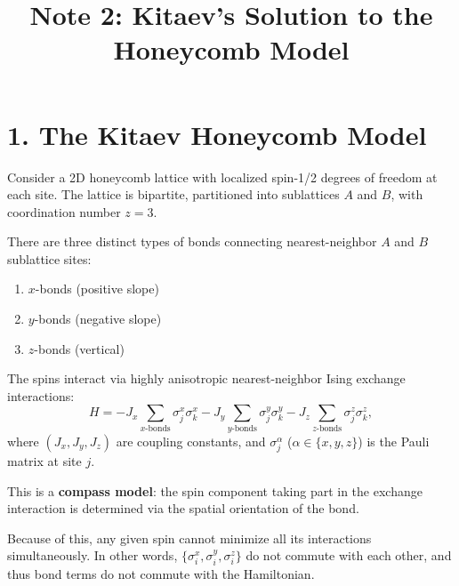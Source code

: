\documentclass[11pt,a4paper]{article}
\title{\textbf{Note 2: Kitaev's Solution to the Honeycomb Model}}
\date{}
\begin{document}
\maketitle

\section*{1. The Kitaev Honeycomb Model}

Consider a 2D honeycomb lattice with localized spin-1/2 degrees of freedom at each site. The lattice is bipartite, partitioned into sublattices $A$ and $B$, with coordination number $z = 3$.

There are three distinct types of bonds connecting nearest-neighbor $A$ and $B$ sublattice sites:
\begin{enumerate}
    \item $x$-bonds (positive slope)
    \item $y$-bonds (negative slope)
    \item $z$-bonds (vertical)
\end{enumerate}

The spins interact via highly anisotropic nearest-neighbor Ising exchange interactions:
\begin{equation}
    H = -J_x \sum_{x\text{-bonds}} \sigma_j^x \sigma_k^x - J_y \sum_{y\text{-bonds}} \sigma_j^y \sigma_k^y - J_z \sum_{z\text{-bonds}} \sigma_j^z \sigma_k^z,
\end{equation}
where $(J_x, J_y, J_z)$ are coupling constants, and $\sigma_j^\alpha$ ($\alpha \in \{x, y, z\}$) is the Pauli matrix at site $j$.

This is a \textbf{compass model}: the spin component taking part in the exchange interaction is determined via the spatial orientation of the bond. 

Because of this, any given spin cannot minimize all its interactions simultaneously. In other words, $\{\sigma_i^x, \sigma_i^y, \sigma_i^z\}$ do not commute with each other, and thus bond terms do not commute with the Hamiltonian.
\end{document}
